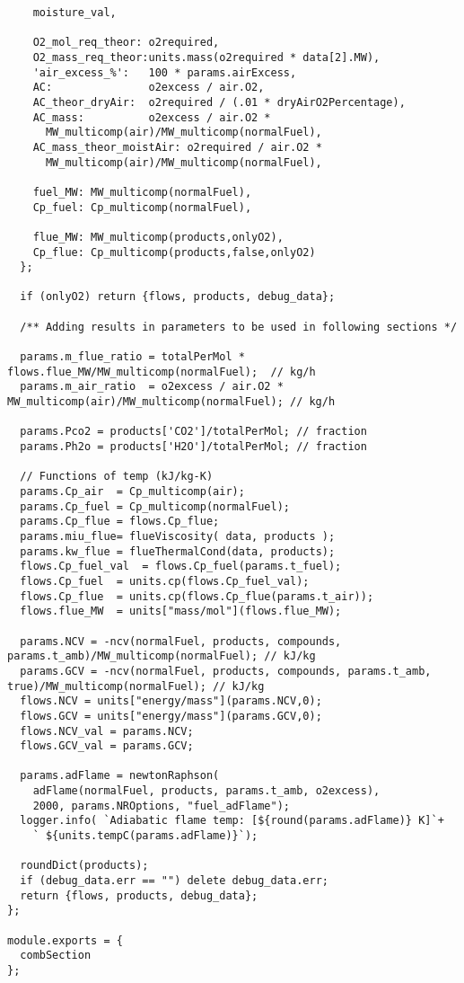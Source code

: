 \begin{verbatim}
    moisture_val,

    O2_mol_req_theor: o2required,
    O2_mass_req_theor:units.mass(o2required * data[2].MW),
    'air_excess_%':   100 * params.airExcess,
    AC:               o2excess / air.O2,
    AC_theor_dryAir:  o2required / (.01 * dryAirO2Percentage),
    AC_mass:          o2excess / air.O2 * 
      MW_multicomp(air)/MW_multicomp(normalFuel),
    AC_mass_theor_moistAir: o2required / air.O2 * 
      MW_multicomp(air)/MW_multicomp(normalFuel),

    fuel_MW: MW_multicomp(normalFuel),
    Cp_fuel: Cp_multicomp(normalFuel),

    flue_MW: MW_multicomp(products,onlyO2),
    Cp_flue: Cp_multicomp(products,false,onlyO2)
  };

  if (onlyO2) return {flows, products, debug_data};

  /** Adding results in parameters to be used in following sections */

  params.m_flue_ratio = totalPerMol * flows.flue_MW/MW_multicomp(normalFuel);  // kg/h
  params.m_air_ratio  = o2excess / air.O2 * MW_multicomp(air)/MW_multicomp(normalFuel); // kg/h

  params.Pco2 = products['CO2']/totalPerMol; // fraction
  params.Ph2o = products['H2O']/totalPerMol; // fraction

  // Functions of temp (kJ/kg-K)
  params.Cp_air  = Cp_multicomp(air);
  params.Cp_fuel = Cp_multicomp(normalFuel);
  params.Cp_flue = flows.Cp_flue;
  params.miu_flue= flueViscosity( data, products );
  params.kw_flue = flueThermalCond(data, products);
  flows.Cp_fuel_val  = flows.Cp_fuel(params.t_fuel);
  flows.Cp_fuel  = units.cp(flows.Cp_fuel_val);
  flows.Cp_flue  = units.cp(flows.Cp_flue(params.t_air));
  flows.flue_MW  = units["mass/mol"](flows.flue_MW);

  params.NCV = -ncv(normalFuel, products, compounds, params.t_amb)/MW_multicomp(normalFuel); // kJ/kg
  params.GCV = -ncv(normalFuel, products, compounds, params.t_amb, true)/MW_multicomp(normalFuel); // kJ/kg
  flows.NCV = units["energy/mass"](params.NCV,0);
  flows.GCV = units["energy/mass"](params.GCV,0);
  flows.NCV_val = params.NCV;
  flows.GCV_val = params.GCV;

  params.adFlame = newtonRaphson(
    adFlame(normalFuel, products, params.t_amb, o2excess),
    2000, params.NROptions, "fuel_adFlame");
  logger.info( `Adiabatic flame temp: [${round(params.adFlame)} K]`+
    ` ${units.tempC(params.adFlame)}`);

  roundDict(products);
  if (debug_data.err == "") delete debug_data.err;
  return {flows, products, debug_data};
};

module.exports = {
  combSection
};
\end{verbatim}

